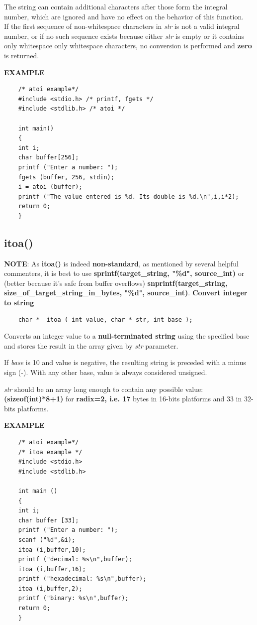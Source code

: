 	The string can contain additional characters after those form the integral number, which are ignored and have no effect on the behavior of this function.\\
	
	If the first sequence of non-whitespace characters in \textit{str} is not a valid integral number, or if no such sequence exists because either \textit{str} is empty or it contains only whitespace only whitespace characters, no conversion is performed and \textbf{zero} is returned.
	
	\textbf{EXAMPLE}
	\begin{verbatim}
	/* atoi example*/
	#include <stdio.h> /* printf, fgets */
	#include <stdlib.h> /* atoi */
	
	int main()
	{
	int i;
	char buffer[256];
	printf ("Enter a number: ");
	fgets (buffer, 256, stdin);
	i = atoi (buffer);
	printf ("The value entered is %d. Its double is %d.\n",i,i*2);
	return 0;
	}
	\end{verbatim}
	
	\subsection{itoa()}
	\textbf{NOTE}: As \textbf{itoa()} is indeed \textbf{non-standard}, as mentioned by several helpful commenters, it is best to use \textbf{sprintf(target\_string, "\%d", source\_int)} or (better because it's safe from buffer overflows) \textbf{snprintf(target\_string, size\_of\_target\_string\_in\_bytes, "\%d", source\_int)}.
	\textbf{Convert integer to string}
	
	\begin{verbatim}
	char *  itoa ( int value, char * str, int base );
	\end{verbatim}
	
	Converts an integer value to a \textbf{null-terminated string} using the specified base and stores the result in the array given by \textit{str} parameter.
	
	If \textit{base} is 10 and value is negative, the resulting string is preceded with a minus sign (-). With any other base, value is always considered unsigned.
	
	\textit{str} should be an array long enough to contain any possible value: \textbf{(sizeof(int)*8+1)} for \textbf{radix=2, i.e. 17} bytes in 16-bits platforms and 33 in 32-bits platforms.
	
	\textbf{EXAMPLE}
	\begin{verbatim}
	/* atoi example*/
	/* itoa example */
	#include <stdio.h>
	#include <stdlib.h>
	
	int main ()
	{
	int i;
	char buffer [33];
	printf ("Enter a number: ");
	scanf ("%d",&i);
	itoa (i,buffer,10);
	printf ("decimal: %s\n",buffer);
	itoa (i,buffer,16);
	printf ("hexadecimal: %s\n",buffer);
	itoa (i,buffer,2);
	printf ("binary: %s\n",buffer);
	return 0;
	}
	\end{verbatim}
	
